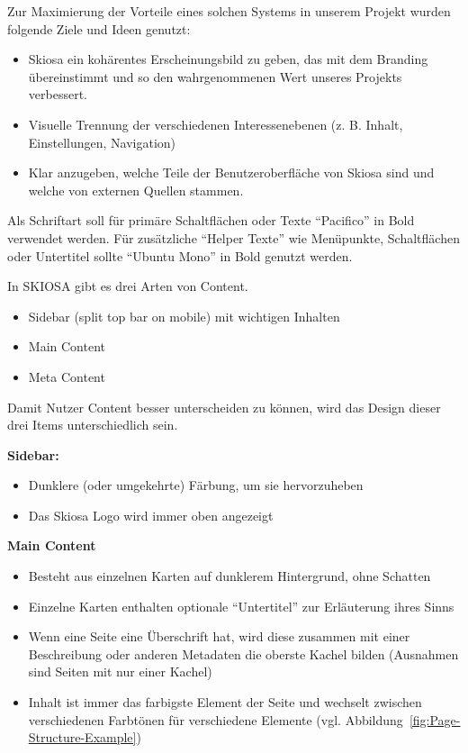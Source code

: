 Zur Maximierung der Vorteile eines solchen Systems in unserem Projekt wurden folgende Ziele und Ideen genutzt:
\begin{itemize}
    \item Skiosa ein kohärentes Erscheinungsbild zu geben, das mit dem Branding übereinstimmt und so den wahrgenommenen Wert unseres Projekts verbessert.
    \item Visuelle Trennung der verschiedenen Interessenebenen (z. B. Inhalt, Einstellungen, Navigation)
    \item Klar anzugeben, welche Teile der Benutzeroberfläche von Skiosa sind und welche von externen Quellen stammen.
\end{itemize}

Als Schriftart soll für primäre Schaltflächen oder Texte \enquote{Pacifico} in Bold verwendet werden.
Für zusätzliche \enquote{Helper Texte} wie Menüpunkte, Schaltflächen oder Untertitel sollte \enquote{Ubuntu Mono} in Bold genutzt werden.

In SKIOSA gibt es drei Arten von Content.  
\begin{itemize}
    \item Sidebar (split top bar on mobile) mit wichtigen Inhalten
    \item Main Content
    \item Meta Content
\end{itemize}

Damit Nutzer Content besser unterscheiden zu können, wird das Design dieser drei Items unterschiedlich sein.

\textbf{Sidebar:}
\begin{itemize}
    \item Dunklere (oder umgekehrte) Färbung, um sie hervorzuheben
    \item Das Skiosa Logo wird immer oben angezeigt
\end{itemize}

\textbf{Main Content}
\begin{itemize}
    \item Besteht aus einzelnen Karten auf dunklerem Hintergrund, ohne Schatten
    \item Einzelne Karten enthalten optionale \enquote{Untertitel} zur Erläuterung ihres Sinns
    \item Wenn eine Seite eine Überschrift hat, wird diese zusammen mit einer Beschreibung oder anderen Metadaten die oberste Kachel bilden (Ausnahmen sind Seiten mit nur einer Kachel)
    \item Inhalt ist immer das farbigste Element der Seite und wechselt zwischen verschiedenen Farbtönen für verschiedene Elemente (vgl. Abbildung~\ref{fig:Page-Structure-Example})
\end{itemize}

